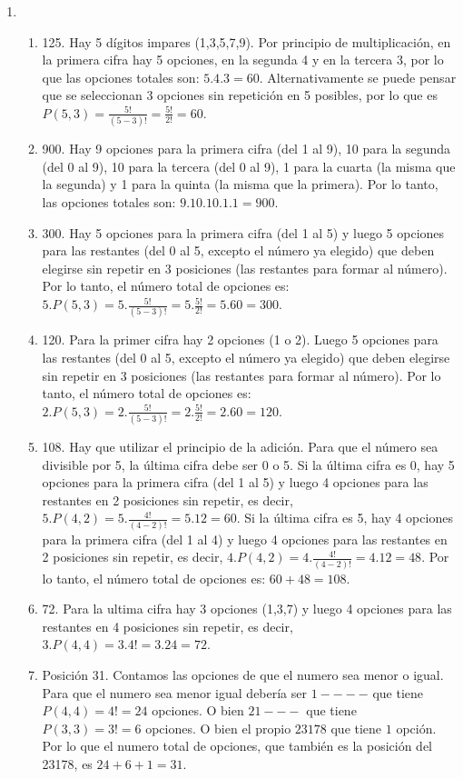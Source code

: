 \documentclass[a4paper]{article}
\newcommand{\exercise}{\item}
\begin{document}
\begin{enumerate}
\begin{enumerate} [label=(\alph*)]
\end{enumerate}\exercise\begin{enumerate} [label=(\alph*)]		\item 125. Hay 5 dígitos impares (1,3,5,7,9). Por principio de multiplicación, en la primera cifra hay 5 opciones, en la segunda 4 y en la tercera 3, por lo que las opciones totales son: $5.4.3 = 60$. Alternativamente se puede pensar que se seleccionan 3 opciones sin repetición en 5 posibles, por lo que es $P(5,3)=\frac{5!}{(5-3)!}=\frac{5!}{2!}=60$.
		\item 900. Hay 9 opciones para la primera cifra (del 1 al 9), 10 para la segunda (del 0 al 9), 10 para la tercera (del 0 al 9), 1 para la cuarta (la misma que la segunda) y 1 para la quinta (la misma que la primera). Por lo tanto, las opciones totales son: $9.10.10.1.1=900$.
		\item 300. Hay 5 opciones para la primera cifra (del 1 al 5) y luego 5 opciones para las restantes (del 0 al 5, excepto el número ya elegido) que deben elegirse sin repetir en 3 posiciones (las restantes para formar al número). Por lo tanto, el número total de opciones es: $5.P(5,3)= 5. \frac{5!}{(5-3)!}= 5. \frac{5!}{2!} = 5.60=300$.
		\item 120. Para la primer cifra hay 2 opciones (1 o 2). Luego 5 opciones para las restantes (del 0 al 5, excepto el número ya elegido) que deben elegirse sin repetir en 3 posiciones (las restantes para formar al número). Por lo tanto, el número total de opciones es: $2.P(5,3)= 2. \frac{5!}{(5-3)!}= 2. \frac{5!}{2!} = 2.60=120$.
		\item 108. Hay que utilizar el principio de la adición. Para que el número sea divisible por 5, la última cifra debe ser 0 o 5. Si la última cifra es 0, hay 5 opciones para la primera cifra (del 1 al 5) y luego 4 opciones para las restantes en 2 posiciones sin repetir, es decir, $5.P(4,2)=5.\frac{4!}{(4-2)!}=5.12=60$. Si la última cifra es 5, hay 4 opciones para la primera cifra (del 1 al 4) y luego 4 opciones para las restantes en 2 posiciones sin repetir, es decir, $4.P(4,2)=4.\frac{4!}{(4-2)!}=4.12=48$. Por lo tanto, el número total de opciones es: $60+48=108$.
		\item 72. Para la ultima cifra hay 3 opciones (1,3,7) y luego 4 opciones para las restantes en 4 posiciones sin repetir, es decir, $3.P(4,4)=3.4!=3.24=72$.
		\item Posición 31. Contamos las opciones de que el numero sea menor o igual. Para que el numero sea menor igual debería ser $1----$ que tiene $P(4,4)=4!=24$ opciones. O bien $21---$ que tiene $P(3,3)=3!=6$ opciones. O bien el propio $23178$ que tiene $1$ opción. Por lo que el numero total de opciones, que también es la posición del 23178, es $24+6+1=31$.

\end{enumerate}
\end{enumerate}
\end{document}
